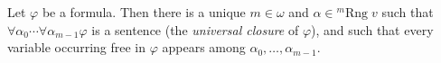 Let $\varphi$ be a formula. Then there is a unique $m \in \omega$ and $\alpha \in {}^m\text{Rng}\;v$ such that $\forall\alpha_0\cdots\forall\alpha_{m-1}\varphi$ is a sentence (the \textit{universal closure} of $\varphi$), and such that every variable occurring free in $\varphi$ appears among $\alpha_0,\ldots,\alpha_{m-1}$.
